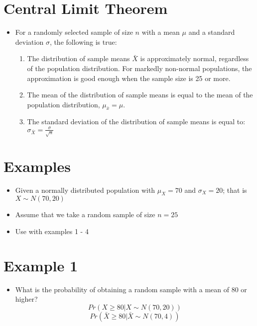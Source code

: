 \documentclass[11pt]{article}
\begin{document}
\section{Central Limit Theorem}\label{central-limit-theorem}

\begin{itemize}
\itemsep1pt\parskip0pt
\item
  For a randomly selected sample of size $n$ with a mean $\mu$ and a
  standard deviation $\sigma$, the following is true:

  \begin{enumerate}
  \def\labelenumi{\arabic{enumi}.}
  \itemsep1pt\parskip0pt
  \item
    The distribution of sample means $\bar{X}$ is approximately normal,
    regardless of the population distribution. For markedly non-normal populations, the approximation is good enough when the sample size is 25 or more.
  \item
    The mean of the distribution of sample means is equal to the mean of
    the population distribution, $\mu_{\bar{x}} = \mu$.
  \item
    The standard deviation of the distribution of sample means is equal
    to: $\sigma_{\bar{X}} = \frac{\sigma}{\sqrt{n}}$
  \end{enumerate}
\end{itemize}

\section{Examples}\label{examples}

\begin{itemize}
\itemsep1pt\parskip0pt
\item
  Given a normally distributed population with \(\mu_{X} = 70\) and
  \(\sigma_{X} = 20\); that is \(X \sim N(70, 20)\)
\item
  Assume that we take a random sample of size \(n = 25\)
\item Use with examples 1 - 4
\end{itemize}

\section{Example 1}\label{example-1}

\begin{itemize}
\itemsep1pt\parskip0pt
\item
  What is the probability of obtaining a random sample with a mean of 80
  or higher? \[ Pr (X \geq 80 | X \sim N(70, 20)) \]
  \[ Pr (\bar{X} \geq 80 | \bar{X} \sim N(70, 4)) \]
\end{itemize}
\end{document}
